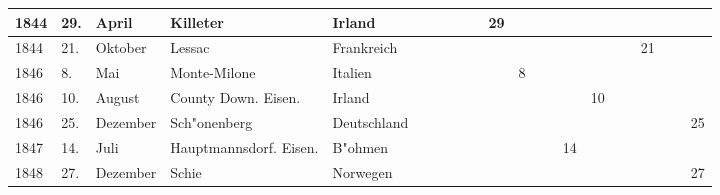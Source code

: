 \documentclass[a4paper, 8pt, oneside, polutonikogreek, german]{article}
\begin{document}
\begin{landscape}
\begin{table}[H]
\begin{longtable}{|p{5mm}|p{4mm}|p{13mm}|p{23mm}|p{16mm}|p{4mm}|p{6mm}|p{6mm}|p{6mm}|p{4mm}|p{5mm}|p{4mm}|p{5mm}|p{6mm}|p{5mm}|p{5mm}|p{5mm}|}
        1844 & 29. & April & Killeter & Irland & ~ & ~ & ~ & 29 & ~ & ~ & ~ & ~ & ~ & ~ & ~ & ~ \\ \hline
        1844 & 21. & Oktober & Lessac & Frankreich & ~ & ~ & ~ & ~ & ~ & ~ & ~ & ~ & ~ & 21 & ~ & ~ \\ \hline
        1846 & 8. & Mai & Monte-Milone & Italien & ~ & ~ & ~ & ~ & 8 & ~ & ~ & ~ & ~ & ~ & ~ & ~ \\ \hline
        1846 & 10. & August & County Down. Eisen. & Irland & ~ & ~ & ~ & ~ & ~ & ~ & ~ & 10 & ~ & ~ & ~ & ~ \\ \hline
        1846 & 25. & Dezember & Sch"onenberg & Deutschland & ~ & ~ & ~ & ~ & ~ & ~ & ~ & ~ & ~ & ~ & ~ & 25 \\ \hline
        1847 & 14. & Juli & Hauptmannsdorf. Eisen. & B"ohmen & ~ & ~ & ~ & ~ & ~ & ~ & 14 & ~ & ~ & ~ & ~ & ~ \\ \hline
        1848 & 27. & Dezember & Schie & Norwegen & ~ & ~ & ~ & ~ & ~ & ~ & ~ & ~ & ~ & ~ & ~ & 27 \\ \hline
    \end{longtable}
\end{table}
\vspace*{\fill}
\end{landscape}
\clearpage
\end{document}

